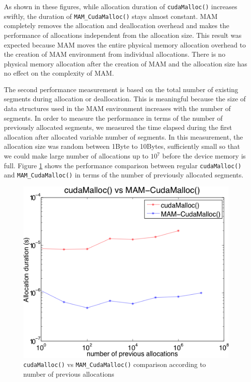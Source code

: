 \documentclass[conference]{IEEEtran}
\def\code#1{\texttt{#1}}
\begin{document}
As shown in these figures, while allocation duration of \code{cudaMalloc()} increases swiftly, the duration of \code{MAM\_CudaMalloc()} stays almost constant. MAM completely removes the allocation and deallocation overhead and makes the performance of allocations independent from the allocation size. This result was expected because MAM moves the entire physical memory allocation overhead to the creation of MAM environment from individual allocations.
There is no physical memory allocation after the creation of MAM and the allocation size has no effect on the complexity of MAM.

The second performance measurement is based on the total number of existing segments during allocation or deallocation. This is meaningful because the size of data structures used in the MAM environment increases with the number of segments. 
In order to measure the performance in terms of the number of previously allocated segments, we measured the time elapsed during the first allocation after allocated variable number of segments. In this measurement, the allocation size was random between 1Byte to 10Bytes, sufficiently small so that we could make large number of allocations up to $10^7$ before the device memory is full. Figure \ref{fig:cm-mcm-pa} shows the performance comparison between regular \code{cudaMalloc()} and \code{MAM\_CudaMalloc()} in terms of the number of previously allocated segments. 

\begin{figure}[h!]
\centering
  \includegraphics[width=0.8\linewidth]{cudamalloc-vs-mamcudamalloc-pa.png}
  \caption{\code{cudaMalloc()} vs \code{MAM\_CudaMalloc()} comparison according to number of previous allocations}
  \label{fig:cm-mcm-pa}
\end{figure}
\end{document}

